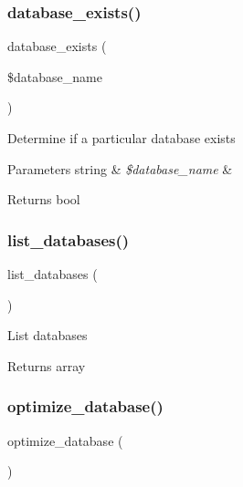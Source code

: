 \subsubsection{\texorpdfstring{database\+\_\+exists()}{database\_exists()}}
{\footnotesize\ttfamily database\+\_\+exists (\begin{DoxyParamCaption}\item[{}]{\$database\+\_\+name }\end{DoxyParamCaption})}

Determine if a particular database exists


\begin{DoxyParams}[1]{Parameters}
string & {\em \$database\+\_\+name} & \\
\hline
\end{DoxyParams}
\begin{DoxyReturn}{Returns}
bool 
\end{DoxyReturn}
\mbox{\label{class_c_i___d_b__utility_a8486b247a8868504b055622cb2dd34d3}} 
\subsubsection{\texorpdfstring{list\+\_\+databases()}{list\_databases()}}
{\footnotesize\ttfamily list\+\_\+databases (\begin{DoxyParamCaption}{ }\end{DoxyParamCaption})}

List databases

\begin{DoxyReturn}{Returns}
array 
\end{DoxyReturn}
\mbox{\label{class_c_i___d_b__utility_acb26598e177f525b39978f6dfca1f212}} 
\subsubsection{\texorpdfstring{optimize\+\_\+database()}{optimize\_database()}}
{\footnotesize\ttfamily optimize\+\_\+database (\begin{DoxyParamCaption}{ }\end{DoxyParamCaption})}

